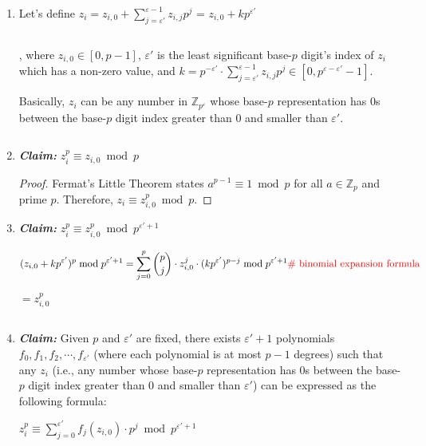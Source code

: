 \begin{enumerate}
\item Let's define $z_i = z_{i,0} + \sum\limits_{j=\varepsilon'}^{\varepsilon-1} z_{i,j}p^j$ = $z_{i,0} + kp^{\varepsilon'}$

$ $

, where $z_{i,0} \in [0, p-1]$, \text{ } $\varepsilon'$ is the least significant base-$p$ digit's index of $z_i$ which has a non-zero value, \text{ } and \text{ } $ k = p^{-\varepsilon'}\cdot \sum\limits_{j=\varepsilon'}^{\varepsilon-1} z_{i,j}p^j \in [0, p^{\varepsilon-\varepsilon'} - 1]$. 

Basically, $z_i$ can be any number in $\mathbb{Z}_{p^\varepsilon}$ whose base-$p$ representation has 0s between the base-$p$ digit index greater than 0 and smaller than $\varepsilon'$.

$ $

\item \textbf{\textit{Claim:}} $z_i^{p} \equiv z_{i,0} \bmod p$ 

\begin{proof}
Fermat's Little Theorem states $a^{p-1} \equiv 1 \bmod p$ for all $a \in \mathbb{Z}_p$ and prime $p$. Therefore, $z_i \equiv z_{i,0}^{p} \bmod p$.
\end{proof}

\item \textbf{\textit{Claim:}} $z_i^p \equiv z_{i, 0}^p \bmod p^{\varepsilon'+1}$ 

\begin{myproof}
\[
(z_{i,0} + kp^{\varepsilon'})^p \bmod p^{\varepsilon'+1}= \sum\limits_{j=0}^{p}  \binom{p}{j}\cdot  z_{i,0}^{j} \cdot (kp^{\varepsilon'})^{p-j} \bmod p^{\varepsilon'+1} \text{\textcolor{red}{ \# binomial expansion formula}} \] 

$= z_{i,0}^{p}$
\end{myproof}

$ $

\item \textbf{\textit{Claim:}} Given $p$ and $\varepsilon'$ are fixed, there exists $\varepsilon'+1$ polynomials $f_0, f_1, f_2, \cdots, f_{\varepsilon'}$ (where each polynomial is at most $p-1$ degrees) such that any $z_i$ (i.e., any number whose base-$p$ representation has 0s between the base-$p$ digit index greater than 0 and smaller than $\varepsilon'$) can be expressed as the following formula:

$z_i^p \equiv \sum\limits_{j=0}^{\varepsilon'}f_j(z_{i,0})\cdot p^j \bmod p^{\varepsilon'+1}$




\end{enumerate}
